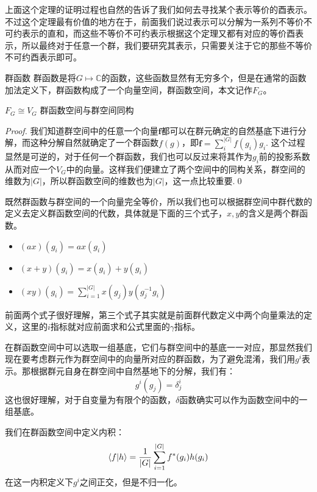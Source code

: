 上面这个定理的证明过程也自然的告诉了我们如何去寻找某个表示等价的酉表示。不过这个定理最有价值的地方在于，前面我们说过表示可以分解为一系列不等价不可约表示的直和，而这些不等价不可约表示根据这个定理又都有对应的等价酉表示，所以最终对于任意一个群，我们要研究其表示，只需要关注于它的那些不等价不可约酉表示即可。

\begin{define}{群函数}
	群函数是将$G\mapsto \mathbb{C}$的函数，这些函数显然有无穷多个，但是在通常的函数加法定义下，群函数构成了一个向量空间，群函数空间，本文记作$F_G$。
\end{define}
\begin{theorem}{$F_G\cong V_G$}
	群函数空间与群空间同构
\end{theorem}
\begin{proof}
	我们知道群空间中的任意一个向量$\mathbf{f}$都可以在群元确定的自然基底下进行分解，而这种分解自然就确定了一个群函数$f(g)$，即$\mathbf{f}=\sum\limits_{i}^{|G|}f(g_i)g_i$. 这个过程显然是可逆的，对于任何一个群函数，我们也可以反过来将其作为$g_i$前的投影系数从而对应一个$V_G$中的向量。这样我们便建立了两个空间中的同构关系，群空间的维数为$|G|$，所以群函数空间的维数也为$|G|$，这一点比较重要.\qed
\end{proof}

既然群函数与群空间的一个向量完全等价，所以我们也可以根据群空间中群代数的定义去定义群函数空间的代数，具体就是下面的三个式子，$x,y$的含义是两个群函数。
\begin{itemize}
	\item $(ax)(g_i)=ax(g_i)$
	\item $(x+y)(g_i)=x(g_i)+y(g_i)$
	\item $(xy)(g_i)=\sum\limits_{i=1}^{|G|}x(g_j)y(g_j^{-1}g_i)$
\end{itemize}

前面两个式子很好理解，第三个式子其实就是前面群代数定义中两个向量乘法的定义，这里的$i$指标就对应前面求和公式里面的$\gamma$指标。

在群函数空间中可以选取一组基底，它们与群空间中的基底一一对应，那显然我们现在要考虑群元作为群空间中的向量所对应的群函数，为了避免混淆，我们用$g^i$表示。那根据群元自身在群空间中自然基地下的分解，我们有：
\[g^i(g_j)=\delta^i_j\]
这也很好理解，对于自变量为有限个的函数，$\delta$函数确实可以作为函数空间中的一组基底。

我们在群函数空间中定义内积：
\begin{equation}
	\braket{f|h}=\frac{1}{|G|}\sum_{i=1}^{|G|}f^*(g_i)h(g_i)
\end{equation}
在这一内积定义下$g^i$之间正交，但是不归一化。

